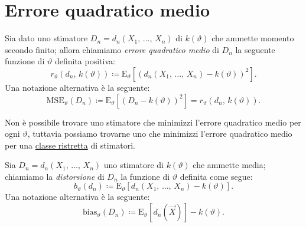     \section{Errore quadratico medio}
    \begin{defn}
        Sia dato uno stimatore $D_n = d_n(X_1,\, \ldots,\, X_{n})$ di $k(\vartheta)$ che ammette 
        momento secondo finito; allora chiamiamo \emph{errore quadratico medio} di $D_n$ 
        la seguente funzione di $\vartheta$ definita positiva:
        \begin{equation}\label{eq:Errore_quadratico_medio}
            r_{\vartheta}\left(d_n,\, k(\vartheta)\right) \coloneqq 
            \text{E}_{\vartheta} \left[(d_n(X_1,\, \ldots,\, X_{n}) - k(\vartheta))^2\right]
        .\end{equation}
        Una notazione alternativa è la seguente: \[
            \scriptstyle \text{MSE} \textstyle_{\vartheta}(D_n) \coloneqq 
            \text{E}_{\vartheta}\left[(D_n - k(\vartheta))^2\right] = 
            r_{\vartheta}\left(d_n,\, k(\vartheta)\right)
        .\] 
    \end{defn}
    \begin{obsv}
        Non è possibile trovare uno stimatore che minimizzi l'errore quadratico medio per ogni $\vartheta$, 
        tuttavia possiamo trovarne uno che minimizzi l'errore quadratico medio per una 
        \underline{classe ristretta} di stimatori.
    \end{obsv}
        \begin{defn}[Distorsione]
            Sia $D_n = d_n(X_1,\, \ldots,\, X_{n})$ uno stimatore di $k(\vartheta)$ che ammette media; 
            chiamiamo la \emph{distorsione} di $D_n$ la funzione di $\vartheta$ definita come segue:
            \begin{equation}\label{eq:Distorsione}
                b_{\vartheta}(d_n) \coloneqq 
                \text{E}_{\vartheta}\left[d_n(X_1,\, \ldots,\, X_{n}) - k(\vartheta)\right]
            .\end{equation}
            Una notazione alternativa è la seguente: \[
                \text{bias}_{\vartheta}(D_n) \coloneqq 
                \text{E}_{\vartheta}\left[d_n(\vec{X})\right] - k(\vartheta)
            .\]
        \end{defn}
